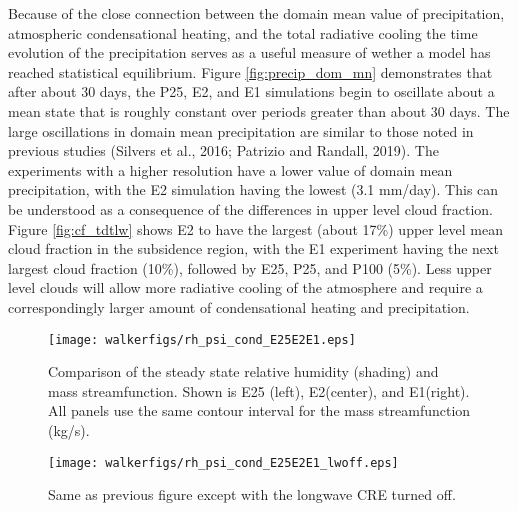 \documentclass[11pt]{article}   	%
\begin{document}
Because of the close connection between the domain mean value of precipitation, atmospheric condensational heating, and 
the total radiative cooling the time evolution of the precipitation serves as a useful measure of wether a model has 
reached statistical equilibrium.  Figure \ref{fig:precip_dom_mn} demonstrates that after about 30 days, the P25, E2, and E1
simulations begin to oscillate about a mean state that is roughly constant over periods greater than about 30 days. 
The large oscillations in domain mean precipitation are similar to those noted in previous studies 
(Silvers et al., 2016; Patrizio and Randall, 2019).   The experiments with a higher resolution have a lower value of domain
mean precipitation, with the E2 simulation having the lowest (3.1 mm/day).  This can be understood as a consequence
of the differences in upper level cloud fraction.   Figure \ref{fig:cf_tdtlw} shows E2 to have the largest (about 17\%) upper level mean cloud
fraction in the subsidence region, with the E1 experiment having the next largest cloud fraction (10\%), followed by E25, P25, and 
P100 (5\%).   Less upper level clouds will allow more radiative cooling of the atmosphere and require a correspondingly larger
amount of condensational heating and precipitation.    

\begin{figure}
  \centering
      \texttt{[image: walkerfigs/rh\_psi\_cond\_E25E2E1.eps]}
      \caption{Comparison of the steady state relative humidity (shading) and mass streamfunction.  
      Shown is E25 (left), E2(center), and E1(right).  All panels use the same contour interval for the 
      mass streamfunction (kg/s).}
  \label{fig:rh_psi_P25E2E1}
\end{figure}

\begin{figure}
  \centering
      \texttt{[image: walkerfigs/rh\_psi\_cond\_E25E2E1\_lwoff.eps]}
      \caption{Same as previous figure except with the longwave CRE turned off.}
  \label{fig:rh_psi_P25E2E1_lwoff}
\end{figure}
\end{document}
